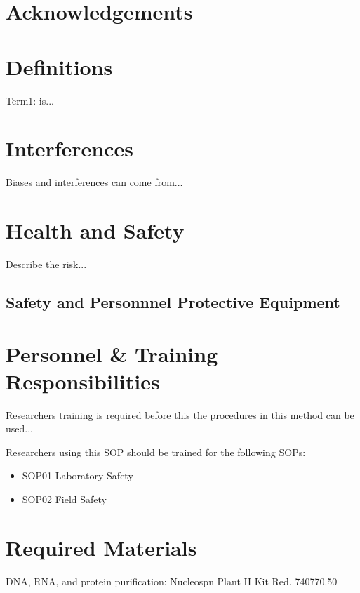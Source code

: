 \documentclass[12pt]{../SOP3_alpha}
\begin{document}
\tableofcontents

\newpage

\section{Acknowledgements}

\section{Definitions}

\NP Term1: is...

\section{Interferences}

\NP Biases and interferences can come from...

\section{Health and Safety}

\NP Describe the risk...


\subsection*{Safety and Personnnel Protective Equipment}


\section{Personnel \& Training Responsibilities}

\NP Researchers training is required before this the procedures in this method can be used... 

\NP Researchers using this SOP should be trained for the following SOPs:

\begin{itemize}
  \item SOP01 Laboratory Safety
  \item SOP02 Field Safety
\end{itemize}

\section{Required Materials}

\NP DNA, RNA, and protein purification: Nucleospn Plant II Kit Red. 740770.50
\end{document}
